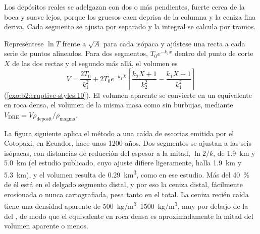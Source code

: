 Los depósitos reales se adelgazan con dos o más pendientes, fuerte cerca de la boca y suave lejos,
porque los  gruesos caen deprisa de la columna y la ceniza fina
deriva. Cada segmento se ajusta por separado y la integral se calcula por
tramos.

\begin{method}\label{met:b2:eruptive-styles:volume}
Represéntese $\ln T$ frente a $\sqrt A$ para cada isópaca y ajústese una recta a cada
serie de puntos alineados. Para dos segmentos, $T_0e^{-k_1x}$ dentro del punto de corte
$X$ de las dos rectas y el segundo más allá, el volumen es
\[
V = \frac{2T_0}{k_1^2} + 2T_0e^{-k_1X}\left[\frac{k_2X + 1}{k_2^2} -
\frac{k_1X + 1}{k_1^2}\right]
\]
(\cref{exo:b2:eruptive-styles:10}). El volumen aparente se convierte en un equivalente en roca densa, el volumen de
la misma masa como  sin burbujas, mediante $V_{\mathrm{DRE}} = V\rho_{\mathrm{deposit}}/\rho_{\mathrm{magma}}$.
\end{method}

La figura siguiente aplica el método a una caída de escorias emitida por el Cotopaxi, en
Ecuador, hace unos \num{1200} años. Dos segmentos se ajustan a las seis isópacas, con
distancias de reducción del espesor a la mitad, $\ln 2/k$, de \qty{1.9}{km} y \qty{5.0}{km} (el
estudio publicado, cuyo ajuste difiere ligeramente, halla \qty{1.9}{km} y
\qty{5.3}{km}), y el volumen resulta de \qty{0.29}{km^3}, como en ese estudio. Más del
\qty{40}{\percent} de él está en el delgado segmento distal, y por eso la ceniza distal,
fácilmente erosionada o nunca cartografiada, pesa tanto en el total. La ceniza recién caída
tiene una densidad aparente de \qtyrange{500}{1500}{kg/m^3}, muy por debajo de la del
, de modo que el equivalente en roca densa es aproximadamente la mitad del volumen aparente o menos.

